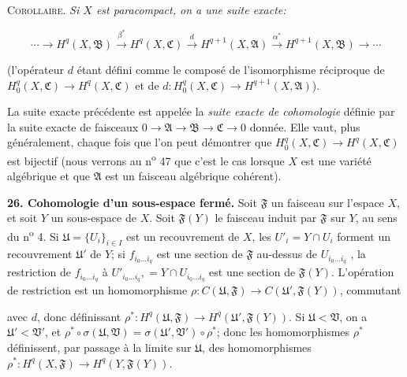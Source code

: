 \textsc{Corollaire}. \textit{Si $X$ est paracompact, on a une suite exacte:}

\begin{equation*}
\cdots \longrightarrow H^q(X, \mathfrak{B}) \overset{\beta^*}{\longrightarrow} H^q(X, \mathfrak{C}) \overset{d}{\longrightarrow} H^{q+1}(X, \mathfrak{A}) \overset{\alpha^*}{\longrightarrow} H^{q+1}(X, \mathfrak{B}) \longrightarrow \cdots
\end{equation*}

(l'opérateur $d$ étant défini comme le composé de l'isomorphisme réciproque de $H_0^q(X, \mathfrak{C}) \rightarrow H^q(X, \mathfrak{C})$ et de $d: H_0^q(X, \mathfrak{C}) \rightarrow H^{q+1}(X, \mathfrak{A})$).

La suite exacte précédente est appelée la \textit{suite exacte de cohomologie} définie par la suite exacte de faisceaux $0 \rightarrow \mathfrak{A} \rightarrow \mathfrak{B} \rightarrow \mathfrak{C} \rightarrow 0$ donnée. Elle vaut, plus généralement, chaque fois que l'on peut démontrer que $H_0^q(X, \mathfrak{C}) \rightarrow H^q(X, \mathfrak{C})$ est bijectif (nous verrons au n\textsuperscript{o} 47 que c'est le cas lorsque $X$ est une variété algébrique et que $\mathfrak{A}$ est un faisceau algébrique cohérent).

\textbf{26. Cohomologie d'un sous-espace fermé.} Soit $\mathfrak{F}$ un faisceau sur l'espace $X$, et soit $Y$ un sous-espace de $X$. Soit $\mathfrak{F}(Y)$ le faisceau induit par $\mathfrak{F}$ sur $Y$, au sens du n\textsuperscript{o} 4. Si $\mathfrak{U} = \{U_i\}_{i \in I}$ est un recouvrement de $X$, les $U'_i = Y \cap U_i$ forment un recouvrement $\mathfrak{U}'$ de $Y$; si $f_{i_0 \ldots i_q}$ est une section de $\mathfrak{F}$ au-dessus de $U_{i_0 \ldots i_q}$ , la restriction de $f_{i_0 \ldots i_q}$ à $U'_{i_0 \ldots i_q},= Y \cap U_{i_0 \ldots i_q}$ est une section de $\mathfrak{F}(Y)$. L'opération de restriction est un homomorphisme $\rho: C(\mathfrak{U}, \mathfrak{F}) \rightarrow C(\mathfrak{U}', \mathfrak{F}(Y))$, commutant



 avec $d$, donc définissant $\rho^*:H^q(\mathfrak{U}, \mathfrak{F}) \to H^q(\mathfrak{U}', \mathfrak{F}(Y))$. Si $\mathfrak{U} < \mathfrak{V}$, on a $\mathfrak{U}' < \mathfrak{V}'$, et $\rho^* \circ \sigma(\mathfrak{U}, \mathfrak{V}) = \sigma(\mathfrak{U}', \mathfrak{V}') \circ \rho^*$; donc les homomorphismes $\rho^*$ définissent, par passage à la limite sur $\mathfrak{U}$, des homomorphismes $\rho^*:H^q(X, \mathfrak{F}) \to H^q(Y, \mathfrak{F}(Y))$.


